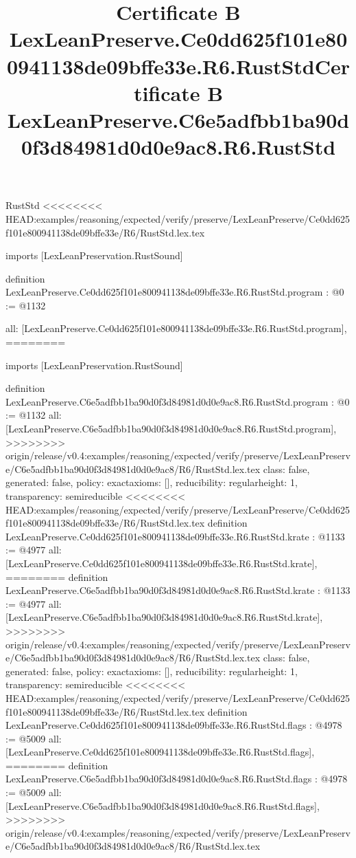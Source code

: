 \begin{lexlean}{RustStd}
<<<<<<<< HEAD:examples/reasoning/expected/verify/preserve/LexLeanPreserve/Ce0dd625f101e800941138de09bffe33e/R6/RustStd.lex.tex
\title{Certificate B LexLeanPreserve.Ce0dd625f101e800941138de09bffe33e.R6.RustStd}
\begin{coremodule}
imports [LexLeanPreservation.RustSound]

definition LexLeanPreserve.Ce0dd625f101e800941138de09bffe33e.R6.RustStd.program : @0 := @1132 {
  all: [LexLeanPreserve.Ce0dd625f101e800941138de09bffe33e.R6.RustStd.program],
========
\title{Certificate B LexLeanPreserve.C6e5adfbb1ba90d0f3d84981d0d0e9ac8.R6.RustStd}
\begin{coremodule}
imports [LexLeanPreservation.RustSound]

definition LexLeanPreserve.C6e5adfbb1ba90d0f3d84981d0d0e9ac8.R6.RustStd.program : @0 := @1132 {
  all: [LexLeanPreserve.C6e5adfbb1ba90d0f3d84981d0d0e9ac8.R6.RustStd.program],
>>>>>>>> origin/release/v0.4:examples/reasoning/expected/verify/preserve/LexLeanPreserve/C6e5adfbb1ba90d0f3d84981d0d0e9ac8/R6/RustStd.lex.tex
  class: false,
  generated: false,
  policy: exact{axioms: []},
  reducibility: regular{height: 1},
  transparency: semireducible
}
<<<<<<<< HEAD:examples/reasoning/expected/verify/preserve/LexLeanPreserve/Ce0dd625f101e800941138de09bffe33e/R6/RustStd.lex.tex
definition LexLeanPreserve.Ce0dd625f101e800941138de09bffe33e.R6.RustStd.krate : @1133 := @4977 {
  all: [LexLeanPreserve.Ce0dd625f101e800941138de09bffe33e.R6.RustStd.krate],
========
definition LexLeanPreserve.C6e5adfbb1ba90d0f3d84981d0d0e9ac8.R6.RustStd.krate : @1133 := @4977 {
  all: [LexLeanPreserve.C6e5adfbb1ba90d0f3d84981d0d0e9ac8.R6.RustStd.krate],
>>>>>>>> origin/release/v0.4:examples/reasoning/expected/verify/preserve/LexLeanPreserve/C6e5adfbb1ba90d0f3d84981d0d0e9ac8/R6/RustStd.lex.tex
  class: false,
  generated: false,
  policy: exact{axioms: []},
  reducibility: regular{height: 1},
  transparency: semireducible
}
<<<<<<<< HEAD:examples/reasoning/expected/verify/preserve/LexLeanPreserve/Ce0dd625f101e800941138de09bffe33e/R6/RustStd.lex.tex
definition LexLeanPreserve.Ce0dd625f101e800941138de09bffe33e.R6.RustStd.flags : @4978 := @5009 {
  all: [LexLeanPreserve.Ce0dd625f101e800941138de09bffe33e.R6.RustStd.flags],
========
definition LexLeanPreserve.C6e5adfbb1ba90d0f3d84981d0d0e9ac8.R6.RustStd.flags : @4978 := @5009 {
  all: [LexLeanPreserve.C6e5adfbb1ba90d0f3d84981d0d0e9ac8.R6.RustStd.flags],
>>>>>>>> origin/release/v0.4:examples/reasoning/expected/verify/preserve/LexLeanPreserve/C6e5adfbb1ba90d0f3d84981d0d0e9ac8/R6/RustStd.lex.tex
}}}
\end{coremodule}}
\end{coremodule}
\end{lexlean}
